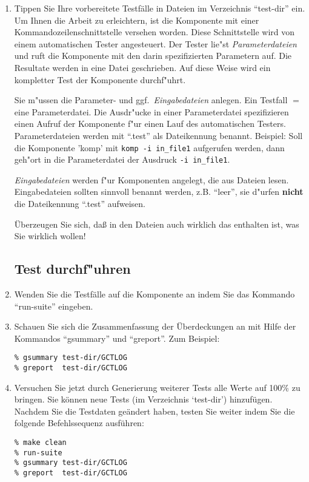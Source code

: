 \begin{enumerate}
\item Tippen Sie Ihre vorbereitete Testf\"alle in Dateien im
Verzeichnis "`test-dir"' ein. Um Ihnen die Arbeit zu erleichtern, ist die
Komponente mit einer Kommandozeilenschnittstelle versehen worden. Diese
Schnittstelle wird von einem automatischen Tester angesteuert. Der Tester
lie"st {\em Parameterdateien\/} und ruft die Komponente mit den darin
spezifizierten Parametern auf. Die Resultate werden in eine Datei geschrieben.
Auf diese Weise wird ein kompletter Test der Komponente durchf"uhrt.

Sie m"ussen die Parameter- und ggf.~{\em Eingabedateien} anlegen. Ein
Testfall $=$ eine Parameterdatei. Die
Ausdr"ucke in einer Parameterdatei spezifizieren einen Aufruf der
Komponente f"ur einen Lauf des automatischen Testers. Parameterdateien werden
mit ``.test'' als Dateikennung benannt. Beispiel: Soll die Komponente 'komp'
mit {\tt komp -i in\_file1} aufgerufen werden, dann geh"ort in
die Parameterdatei der Ausdruck {\tt -i in\_file1}.

{\em Eingabedateien\/} werden f"ur Komponenten angelegt, die aus
Dateien lesen. Eingabedateien sollten sinnvoll benannt werden,
z.B. ``leer'', sie d"urfen {\bf nicht} die Dateikennung ``.test'' aufweisen.

\"Uberzeugen Sie sich, da{\ss} in den Dateien auch wirklich das
enthalten ist, was Sie wirklich wollen!



\subsection*{Test durchf"uhren}

\item Wenden Sie die Testf\"alle auf die Komponente an indem Sie das
Kommando "`run-suite"' eingeben. 

\item Schauen Sie sich die Zusammenfassung der \"Uberdeckungen an
mit Hilfe der Kommandos "`gsummary"' und "`greport"'.
Zum Beispiel:
\begin{verbatim}
% gsummary test-dir/GCTLOG
% greport  test-dir/GCTLOG
\end{verbatim}

\item Versuchen Sie jetzt durch Generierung weiterer Tests alle Werte
auf 100\% zu bringen. Sie k\"onnen neue Tests (im Verzeichnis
`test-dir') hinzuf\"ugen.  Nachdem Sie die Testdaten ge\"andert haben,
testen Sie weiter indem Sie die folgende Befehlssequenz ausf\"uhren: 
\begin{verbatim}
% make clean 
% run-suite 
% gsummary test-dir/GCTLOG 
% greport  test-dir/GCTLOG
\end{verbatim}


\end{enumerate}
